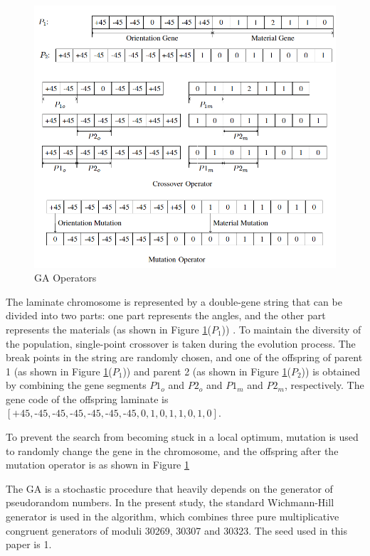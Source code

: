 \documentclass[USenglish,twocolumn]{article}
\begin{document}
\begin{figure}[!hbt]
  \includegraphics[width=\linewidth]{A_laminate_design_images/ga_operator.png}
\caption{GA Operators\label{GA:operator}}
\end{figure}

The laminate chromosome is represented by a double-gene string that can be divided into two parts:
one part represents the angles, and the other part represents the materials (as shown in Figure
\ref{GA:operator}($P_1$)) . To maintain the diversity of the population, single-point crossover is
taken during the evolution process. The break points in the string are randomly chosen, and one of
the offspring of parent 1 (as shown in Figure \ref{GA:operator}($P_1$)) and parent 2 (as shown in
Figure \ref{GA:operator}($P_2$)) is obtained by combining the gene segments $P1_o$ and $P2_o$ and
$P1_m$ and $P2_m$, respectively. The gene code of the offspring laminate is
$[\text{+}45,\text{-}45,\text{-}45,\text{-}45,\text{-}45,\text{-}45,\text{-}45,0,1,0,1,1,0,1,0]$.


To prevent the search from becoming stuck in a local optimum, mutation is used to randomly change the
gene in the chromosome, and the offspring after the mutation operator is as shown in Figure
\ref{GA:operator}

The GA is a stochastic procedure that heavily depends on the generator of pseudorandom numbers. In
the present study, the standard Wichmann-Hill generator is used in the algorithm, which combines
three pure multiplicative congruent generators of moduli 30269, 30307 and 30323. The seed used
in this paper is 1.
\end{document}
